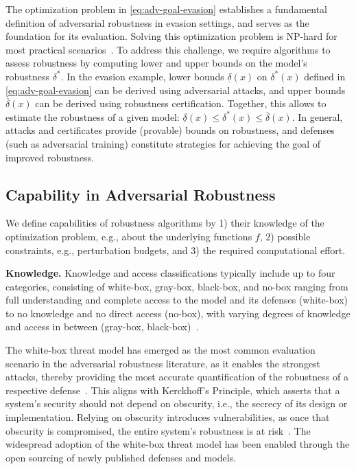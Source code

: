 The optimization problem in \autoref{eq:adv-goal-evasion} establishes a fundamental definition of adversarial robustness in evasion settings, and serves as the foundation for its evaluation. Solving this optimization problem is NP-hard for most practical scenarios~\cite{katz2017reluplex}. To address this challenge, we require algorithms to assess robustness by computing lower and upper bounds on the model's robustness $\delta^*$. 
%
In the evasion example, lower bounds $\underline{\delta}(x)$ on $\delta^*(x)$ defined in \autoref{eq:adv-goal-evasion} can be derived using adversarial attacks, and upper bounds $\overline{\delta}(x)$ can be derived using robustness certification. Together, this allows to estimate the robustness of a given model: $\underline{\delta}(x) \leq \delta^*(x) \leq \overline{\delta}(x)$. In general, attacks and certificates provide (provable) bounds on robustness, and defenses (such as adversarial training) constitute strategies for achieving the goal of improved robustness.
\vspace{-5pt}
\subsection{Capability in Adversarial Robustness}\label{sec:tax-capability}%
We define capabilities of robustness algorithms by 1) their knowledge of the optimization problem, e.g., about the underlying functions $f$, 2) possible constraints, e.g., perturbation budgets, and 3) the required computational effort. 

\textbf{Knowledge.} Knowledge and access classifications typically include up to four categories, consisting of white-box, gray-box, black-box, and no-box ranging from full understanding and complete access to the model and its defenses (white-box) to no knowledge and no direct access (no-box), with varying degrees of knowledge and access in between (gray-box, black-box)~\citep{papernot_practical_2017, bose_adversarial_2020}.

The white-box threat model has emerged as the most common evaluation scenario in the adversarial robustness literature, as it enables the strongest attacks, thereby providing the most accurate quantification of the robustness of a respective defense~\citep{papernot_practical_2017}.
This aligns with Kerckhoff's Principle, which asserts that a system's security should not depend on obscurity, i.e., the secrecy of its design or implementation. Relying on obscurity introduces vulnerabilities, as once that obscurity is compromised, the entire system's robustness is at risk~\citep{sasa_kerk_2008,athalye_obfuscated_2018}.
The widespread adoption of the white-box threat model has been enabled through the open sourcing of newly published defenses and models.

